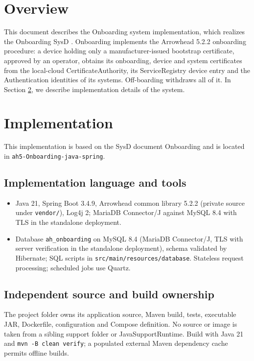 \documentclass[a4paper]{arrowhead}
\begin{document}
\section{Overview}
\label{sec:overview}

This document describes the Onboarding system implementation, which realizes the Onboarding SysD \cite{onb-sysd}. Onboarding implements the Arrowhead 5.2.2 onboarding procedure: a device holding only a manufacturer-issued bootstrap certificate, approved by an operator, obtains its onboarding, device and system certificates from the local-cloud Certificate\allowbreak{}Authority, its ServiceRegistry device entry and the Authentication identities of its systems. Off-boarding withdraws all of it.
In Section \ref{Implementation}, we describe implementation details of the system.

\newpage

\section{Implementation}
\label{Implementation}

This implementation is based on the SysD document Onboarding \cite{onb-sysd} and is located in \texttt{ah5-Onboarding-java-spring}.

\subsection{Implementation language and tools}
\begin{itemize}
\item Java 21, Spring Boot 3.4.9, Arrowhead common library 5.2.2 (private source under \texttt{vendor/}), Log4j 2; MariaDB Connector/J against MySQL 8.4 with TLS in the standalone deployment.
\item Database \texttt{ah\_\allowbreak{}onboarding} on MySQL 8.4 (MariaDB Connector/J, TLS with server verification in the standalone deployment), schema validated by Hibernate; SQL scripts in \texttt{src/\allowbreak{}main/\allowbreak{}resources/\allowbreak{}database}. Stateless request processing; scheduled jobs use Quartz.
\end{itemize}

\subsection{Independent source and build ownership}
The project folder owns its application source, Maven build, tests, executable JAR, Dockerfile, configuration and Compose definition. No source or image is taken from a sibling support folder or JavaSupportRuntime. Build with Java 21 and \texttt{mvn -B clean verify}; a populated external Maven dependency cache permits offline builds.
\end{document}
